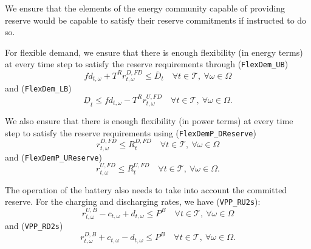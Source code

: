 \documentclass{article}
\begin{document}

We ensure that the elements of the energy community capable of providing reserve would be capable to satisfy their reserve commitments if instructed to do so. 

For flexible demand, we ensure that there is enough flexibility (in energy terms) at every time step to satisfy the reserve requirements through (\verb|FlexDem_UB|)
\begin{equation} \label{EQ:FlexDemand_UB}
	fd_{t, \omega} + T^R r^{D, FD}_{t, \omega} \leq \overline{D}_t \quad \forall t \in \mathcal{T}, \ \forall \omega \in \Omega
\end{equation}
and (\verb|FlexDem_LB|)
\begin{equation} \label{EQ:FlexDemand_LB}
	\underline{D}_t \leq fd_{t, \omega} - T^R r^{U, FD}_{t, \omega} \quad \forall t \in \mathcal{T}, \ \forall \omega \in \Omega.
\end{equation}

We also ensure that there is enough flexibility (in power terms) at every time step to satisfy the reserve requirements using (\verb|FlexDemP_DReserve|)
\begin{equation} \label{EQ:FlexDemP_DReserve}
	r^{D, FD}_{t, \omega} \leq R^{D, FD}_t \quad \forall t \in \mathcal{T}, \ \forall \omega \in \Omega
\end{equation}
and (\verb|FlexDemP_UReserve|)
\begin{equation} \label{EQ:FlexDemP_UReserve}
	r^{U, FD}_{t, \omega} \leq R^{U, FD}_t \quad \forall t \in \mathcal{T}, \ \forall \omega \in \Omega.
\end{equation}

The operation of the battery also needs to take into account the committed reserve. For the charging and discharging rates, we have (\verb|VPP_RU2s|):
\begin{equation} \label{EQ:VPP_RU2s}
	r^{U, B} _{t, \omega} - c_{t, \omega} + d_{t, \omega}  \leq P^B \quad \forall t \in \mathcal{T}, \ \forall \omega \in \Omega
\end{equation}
and (\verb|VPP_RD2s|)
\begin{equation} \label{EQ:VPP_RD2s}
	r^{D, B}_{t, \omega} + c_{t, \omega} - d_{t, \omega} \leq P^B \quad \forall t \in \mathcal{T}, \ \forall \omega \in \Omega.
\end{equation}
\end{document}
